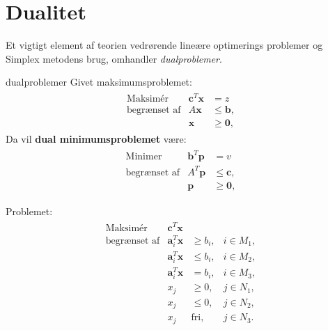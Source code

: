 \section{Dualitet}
%
Et vigtigt element af teorien vedrørende lineære optimerings problemer og Simplex metodens brug, omhandler \textit{dualproblemer}.
%
\begin{defn}{}{dualproblemer}
Givet maksimumsproblemet: 
%
\begin{align*}
\begin{array}{lrl}
\text{Maksimér}		&\textbf{c}^T\textbf{x}	& = z		\\
\text{begrænset af}	&A\textbf{x}	&\leq \mathbf{b},	\\
					&\mathbf{x}				&\geq \mathbf{0},
\end{array}
\end{align*}
%
Da vil \textbf{dual minimumsproblemet} være: \\
%
\begin{align*}
\begin{array}{lrl}
\text{Minimer}		&\textbf{b}^T\textbf{p}	& = v			\\
\text{begrænset af}	&A^T \textbf{p}	&\leq \mathbf{c},	\\
					&\mathbf{p}				&\geq \mathbf{0},
\end{array}
\end{align*}
%
\end{defn}
%
Problemet:
%
\begin{align*}
\begin{array}{lrll}
\text{Maksimér}		&\textbf{c}^T\textbf{x}	&			&\\
\text{begrænset af}	&\textbf{a}_i^T\textbf{x}	&\geq b_i,	&i \in M_1,\\
					&\textbf{a}_i^T\textbf{x}	&\leq b_i,	&i \in M_2,\\
					&\textbf{a}_i^T\textbf{x}	& = b_i,	&i \in M_3,\\
					&x_j					&\geq 0,	&j \in N_1,\\
					&x_j					&\leq 0,	&j \in N_2,\\							&x_j					&\text{fri},	&j \in N_3.
\end{array}
\end{align*}

